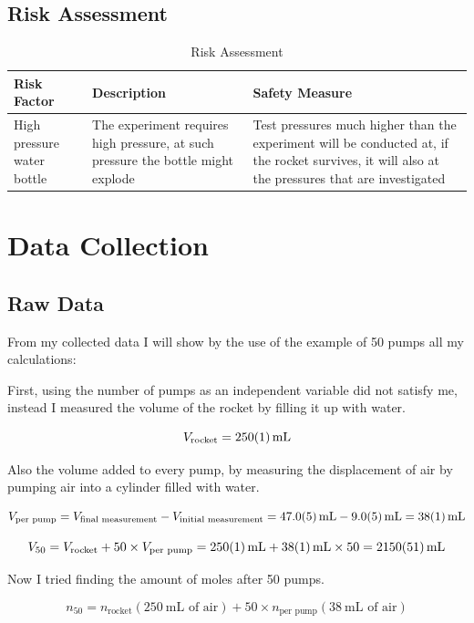 \documentclass[12pt,a4paper]{article}
\begin{document}
\subsection{Risk Assessment}

\begin{table}[H]
\centering
\caption{Risk Assessment}
\begin{tabular}{p{4cm}p{5cm}p{6cm}}
\toprule
\textbf{Risk Factor} & \textbf{Description} & \textbf{Safety Measure} \\
\midrule
High pressure water bottle & The experiment requires high pressure, at such pressure the bottle might explode & Test pressures much higher than the experiment will be conducted at, if the rocket survives, it will also at the pressures that are investigated \\
\bottomrule
\end{tabular}
\end{table}

\section{Data Collection}

\subsection{Raw Data}

From my collected data I will show by the use of the example of 50 pumps all my calculations:

First, using the number of pumps as an independent variable did not satisfy me, instead I measured the volume of the rocket by filling it up with water.

$$V_{\text{rocket}} = \SI{250 \pm 1}{\milli\liter}$$

Also the volume added to every pump, by measuring the displacement of air by pumping air into a cylinder filled with water.

$$V_{\text{per pump}} = V_{\text{final measurement}} - V_{\text{initial measurement}} = \SI{47.0 \pm 0.5}{\milli\liter} - \SI{9.0 \pm 0.5}{\milli\liter} = \SI{38 \pm 1}{\milli\liter}$$

$$V_{50} = V_{\text{rocket}} + 50 \times V_{\text{per pump}} = \SI{250 \pm 1}{\milli\liter} + \SI{38 \pm 1}{\milli\liter} \times 50 = \SI{2150 \pm 51}{\milli\liter}$$

Now I tried finding the amount of moles after 50 pumps.

$$n_{50} = n_{\text{rocket}} (\SI{250}{\milli\liter} \text{ of air}) + 50 \times n_{\text{per pump}} (\SI{38}{\milli\liter} \text{ of air})$$
\end{document}
